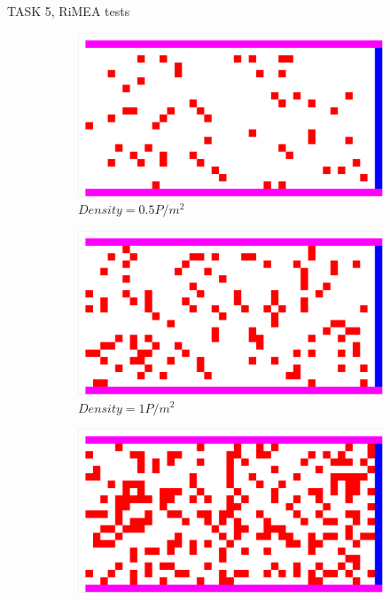 \documentclass[10pt,a4paper]{article}
\begin{document}
\begin{task}{TASK 5, RiMEA tests}
\begin{figure}[htbp]
  \centering
  \begin{subfigure}[b]{0.31\textwidth}
    \includegraphics[width=\textwidth]{pictures/test2_0.5.png}
    \caption{$Density = 0.5 P/m^2$}
    \label{fig:test2_0.5}
  \end{subfigure}
  \begin{subfigure}[b]{0.31\textwidth}
    \includegraphics[width=\textwidth]{pictures/test2_1.png}
    \caption{$Density = 1 P/m^2$}
    \label{fig:test2_1}
  \end{subfigure}
  \begin{subfigure}[b]{0.31\textwidth}
    \includegraphics[width=\textwidth]{pictures/test2_2.png}

\end{subfigure}
\end{figure}
\end{task}
\end{document}
